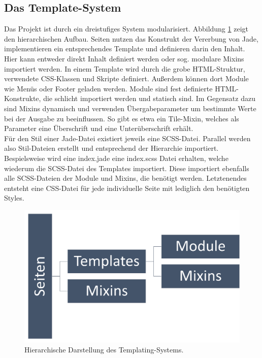 \subsection{Das Template-System}
Das Projekt ist durch ein dreistufiges System modularisiert. Abbildung \ref{pre:system} zeigt den hierarchischen Aufbau. Seiten nutzen das Konstrukt der Vererbung von Jade, implementieren ein entsprechendes Template und definieren darin den Inhalt. Hier kann entweder direkt Inhalt definiert werden oder sog. modulare Mixins importiert werden.
In einem Template wird durch die grobe HTML-Struktur, verwendete CSS-Klassen und Skripte definiert. Außerdem können dort Module wie Menüs oder Footer geladen werden.
Module sind fest definierte HTML-Konstrukte, die schlicht importiert werden und statisch sind.
Im Gegensatz dazu sind Mixins dynamisch und verwenden Übergabeparameter um bestimmte Werte bei der Ausgabe zu beeinflussen. So gibt es etwa ein Tile-Mixin, welches als Parameter eine Überschrift und eine Unterüberschrift erhält.
\\
Für den Stil einer Jade-Datei existiert jeweils eine SCSS-Datei. Parallel werden also Stil-Dateien erstellt und entsprechend der Hierarchie importiert. Bespielsweise wird eine index.jade eine index.scss Datei erhalten, welche wiederum die SCSS-Datei des Templates importiert. Diese importiert ebenfalls alle SCSS-Dateien der Module und Mixins, die benötigt werden.
Letztenendes entsteht eine CSS-Datei für jede individuelle Seite mit lediglich den benötigten Styles.

\begin{figure} [tp]
	\includegraphics[width=\textwidth]{./img/pre_system.png}
	\caption{Hierarchische Darstellung des Templating-Systems.}
	\label{pre:system}
\end{figure}